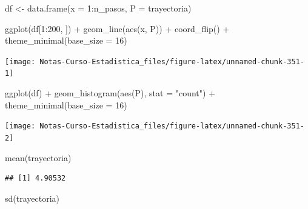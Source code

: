 \documentclass[
  12pt,
]{book}
\newenvironment{Shaded}{\begin{snugshade}}{\end{snugshade}}
\newcommand{\AttributeTok}[1]{\textcolor[rgb]{0.77,0.63,0.00}{#1}}
\newcommand{\DecValTok}[1]{\textcolor[rgb]{0.00,0.00,0.81}{#1}}
\newcommand{\FunctionTok}[1]{\textcolor[rgb]{0.00,0.00,0.00}{#1}}
\newcommand{\NormalTok}[1]{#1}
\newcommand{\OtherTok}[1]{\textcolor[rgb]{0.56,0.35,0.01}{#1}}
\newcommand{\SpecialCharTok}[1]{\textcolor[rgb]{0.00,0.00,0.00}{#1}}
\newcommand{\StringTok}[1]{\textcolor[rgb]{0.31,0.60,0.02}{#1}}
\theoremstyle{definition}
\theoremstyle{definition}
\theoremstyle{definition}
\theoremstyle{definition}
\theoremstyle{remark}
\begin{document}
\begin{Shaded}
\begin{Highlighting}[]
\NormalTok{df }\OtherTok{\textless{}{-}} \FunctionTok{data.frame}\NormalTok{(}\AttributeTok{x =} \DecValTok{1}\SpecialCharTok{:}\NormalTok{n\_pasos, }\AttributeTok{P =}\NormalTok{ trayectoria)}

\FunctionTok{ggplot}\NormalTok{(df[}\DecValTok{1}\SpecialCharTok{:}\DecValTok{200}\NormalTok{, ]) }\SpecialCharTok{+} \FunctionTok{geom\_line}\NormalTok{(}\FunctionTok{aes}\NormalTok{(x, P)) }\SpecialCharTok{+} \FunctionTok{coord\_flip}\NormalTok{() }\SpecialCharTok{+}
    \FunctionTok{theme\_minimal}\NormalTok{(}\AttributeTok{base\_size =} \DecValTok{16}\NormalTok{)}
\end{Highlighting}
\end{Shaded}

\begin{center}\texttt{[image: Notas-Curso-Estadistica\_files/figure-latex/unnamed-chunk-351-1]} \end{center}

\begin{Shaded}
\begin{Highlighting}[]
\FunctionTok{ggplot}\NormalTok{(df) }\SpecialCharTok{+} \FunctionTok{geom\_histogram}\NormalTok{(}\FunctionTok{aes}\NormalTok{(P), }\AttributeTok{stat =} \StringTok{"count"}\NormalTok{) }\SpecialCharTok{+}
    \FunctionTok{theme\_minimal}\NormalTok{(}\AttributeTok{base\_size =} \DecValTok{16}\NormalTok{)}
\end{Highlighting}
\end{Shaded}

\begin{center}\texttt{[image: Notas-Curso-Estadistica\_files/figure-latex/unnamed-chunk-351-2]} \end{center}

\begin{Shaded}
\begin{Highlighting}[]
\FunctionTok{mean}\NormalTok{(trayectoria)}
\end{Highlighting}
\end{Shaded}

\begin{verbatim}
## [1] 4.90532
\end{verbatim}

\begin{Shaded}
\begin{Highlighting}[]
\FunctionTok{sd}\NormalTok{(trayectoria)}
\end{Highlighting}
\end{Shaded}
\end{document}

